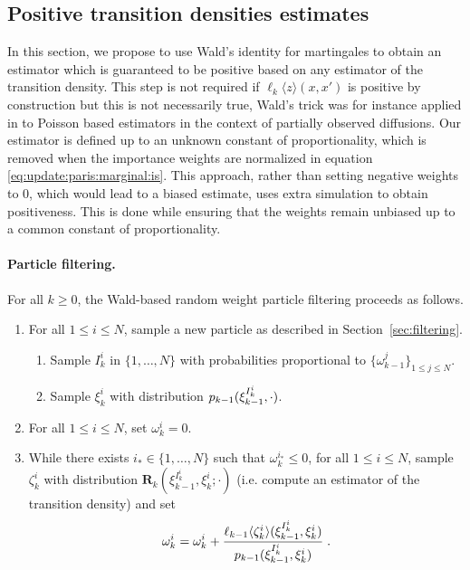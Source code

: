 \documentclass{article}
\newcommand{\N}{N}
\newcommand{\kissforward}[3][]
{\ifthenelse{\equal{#1}{}}{p_{#2}}
{\ifthenelse{\equal{#1}{fully}}{p^{\star}_{#2}}
{\ifthenelse{\equal{#1}{smooth}}{\tilde{r}_{#2}}{\mathrm{erreur}}}}}
\newcommand{\adjfuncforward}[1]{\vartheta_{#1}}
\newcommand{\eqsp}{\;}
\newcommand{\ewght}[2]{\ensuremath{\omega_{#1}^{#2}}}
\newcommand{\epart}[2]{\ensuremath{\xi_{#1}^{#2}}}
\newcommand{\kernelmarg}{\mathbf{R}}
\newcommand{\hatqg}[1]{\mathsf{\ell}_{#1}}
\begin{document}
\subsection{Positive transition densities estimates}
In this section, we propose to use Wald’s identity for martingales to obtain an  estimator which is guaranteed to be positive based on any estimator of the transition density.  This step is not required if $\hatqg{k}\langle z\rangle(x,x')$ is positive by construction but this is not necessarily true, Wald's trick was for instance applied in \cite{fearnhead2010random} to Poisson based estimators in the context of partially observed diffusions. Our estimator is defined up to an unknown constant of proportionality, which is removed when the importance weights are normalized in equation \eqref{eq:update:paris:marginal:is}. 
This approach, rather than setting negative weights to 0, which would lead to a biased estimate, uses extra simulation to obtain positiveness. This is done while ensuring that the weights remain unbiased up to a common constant of proportionality.%

\paragraph{Particle filtering.}  
For all $k\geqslant 0$, the Wald-based random weight particle filtering proceeds as follows.
\begin{enumerate}
\item For all $1\leqslant i\leqslant \N$, sample a new particle as described in Section~\ref{sec:filtering}.
\begin{enumerate}
\item Sample $I_k^{i}$ in $\{1,\ldots,\N\}$ with probabilities proportional to $\{\ewght{k-1}{j} 
\}_{1\leqslant j\leqslant \N}$.
\item Sample $\epart{k}{i}$ with distribution $\kissforward{k-1}{k-1}(\epart{k-1}{I_k^{i}},\cdot)$.
\end{enumerate}
\item For all $1\leqslant i\leqslant \N$, set  $\ewght{k}{i}= 0$.
\item While there exists $i_* \in\{1,\ldots,\N\}$ such that $\ewght{k}{i_*} \leqslant 0$, for all $1\leqslant i\leqslant \N$, sample $\zeta_k^{i}$ with distribution $\kernelmarg_{k}(\epart{k-1}{I_k^{i}},\epart{k}{i};\cdot)$ (i.e. compute an estimator of the transition density) and set 
$$
\ewght{k}{i}  = \ewght{k}{i} + \frac{\hatqg{k-1}\langle \zeta_k^i\rangle(\epart{k-1}{I_k^{i}},\epart{k}{i}) }{\kissforward{k-1}{k-1}(\epart{k-1}{I_k^{i}},\epart{k}{i})}\eqsp.
$$
\end{enumerate}
\end{document}
